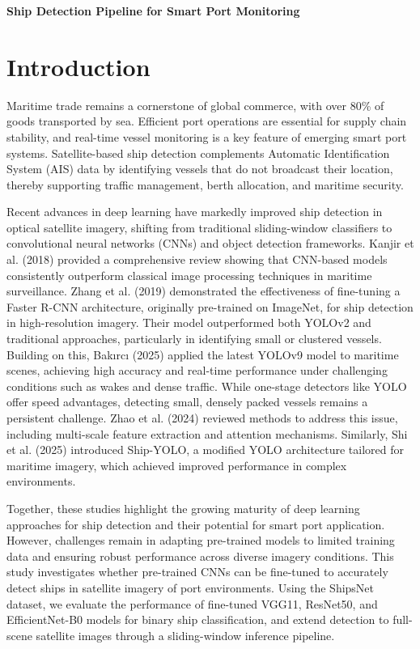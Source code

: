 \documentclass[11pt]{article}
\begin{document}
	
	\begin{center}
		\LARGE\textbf{Ship Detection Pipeline for Smart Port Monitoring}
	\end{center}
	
	\section*{Introduction}
	
	Maritime trade remains a cornerstone of global commerce, with over 80\% of goods transported by sea. Efficient port operations are essential for supply chain stability, and real-time vessel monitoring is a key feature of emerging smart port systems. Satellite-based ship detection complements Automatic Identification System (AIS) data by identifying vessels that do not broadcast their location, thereby supporting traffic management, berth allocation, and maritime security.
	
	Recent advances in deep learning have markedly improved ship detection in optical satellite imagery, shifting from traditional sliding-window classifiers to convolutional neural networks (CNNs) and object detection frameworks. Kanjir et al. (2018) provided a comprehensive review showing that CNN-based models consistently outperform classical image processing techniques in maritime surveillance. Zhang et al. (2019) demonstrated the effectiveness of fine-tuning a Faster R-CNN architecture, originally pre-trained on ImageNet, for ship detection in high-resolution imagery. Their model outperformed both YOLOv2 and traditional approaches, particularly in identifying small or clustered vessels. Building on this, Bakırcı (2025) applied the latest YOLOv9 model to maritime scenes, achieving high accuracy and real-time performance under challenging conditions such as wakes and dense traffic. While one-stage detectors like YOLO offer speed advantages, detecting small, densely packed vessels remains a persistent challenge. Zhao et al. (2024) reviewed methods to address this issue, including multi-scale feature extraction and attention mechanisms. Similarly, Shi et al. (2025) introduced Ship-YOLO, a modified YOLO architecture tailored for maritime imagery, which achieved improved performance in complex environments.
	
	Together, these studies highlight the growing maturity of deep learning approaches for ship detection and their potential for smart port application. However, challenges remain in adapting pre-trained models to limited training data and ensuring robust performance across diverse imagery conditions. This study investigates whether pre-trained CNNs can be fine-tuned to accurately detect ships in satellite imagery of port environments. Using the ShipsNet dataset, we evaluate the performance of fine-tuned VGG11, ResNet50, and EfficientNet-B0 models for binary ship classification, and extend detection to full-scene satellite images through a sliding-window inference pipeline.
	
\end{document}
